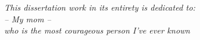 \begin{center}
\vspace*{7cm}
\emph{This dissertation work in its entirety is dedicated to:\\ -- My mom -- \\ who is the most courageous person I've ever known}
\end{center}
